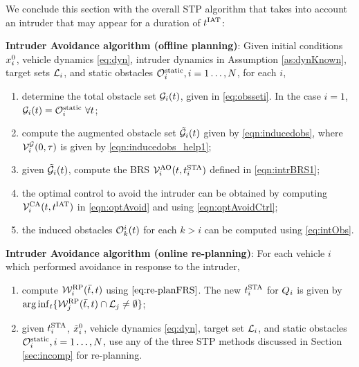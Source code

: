 We conclude this section with the overall STP algorithm that takes into account an intruder that may appear for a duration of $t^\text{IAT}$: 
\begin{alg}
\label{alg:intruder}
\textbf{Intruder Avoidance algorithm (offline planning)}: Given initial conditions $x_i^0$, vehicle dynamics \eqref{eq:dyn}, intruder dynamics in Assumption \ref{as:dynKnown}, target sets $\mathcal{L}_i$, and static obstacles $\mathcal{O}^\text{static}_i, i = 1\ldots, N$, for each $i$,
\begin{enumerate}
\item determine the total obstacle set $\mathcal{G}_i(t)$, given in \eqref{eq:obsseti}. In the case $i=1$, $\mathcal{G}_i(t) = \mathcal{O}^\text{static}_i ~ \forall t$;
\item compute the augmented obstacle set $\tilde{\mathcal{G}}_i(t)$ given by \eqref{eqn:inducedobs}, where $\mathcal{V}^{\mathcal{G}}_{i}(0, \tau)$ is given by \eqref{eqn:inducedobs_help1};
\item given $\tilde{\mathcal{G}}_i(t)$, compute the BRS $\mathcal{V}^{\text{AO}}_{i}(t, t^\text{STA}_i)$ defined in \eqref{eqn:intrBRS1};
\item the optimal control to avoid the intruder can be obtained by computing $\mathcal{V}^{\text{CA}}_{i}(t, t^\text{IAT})$ in \eqref{eqn:optAvoid} and using \eqref{eqn:optAvoidCtrl};
\item the induced obstacles $\mathcal{O}_k^i(t)$ for each $k>i$ can be computed using \eqref{eq:intObs}.
\end{enumerate}

\textbf{Intruder Avoidance algorithm (online re-planning)}: For each vehicle $i$ which performed avoidance in response to the intruder,
\begin{enumerate}
\item compute $\mathcal{W}_i^{\text{RP}}(\bar{t}, t)$ using $\eqref{eq:re-planFRS}$. The new $t^\text{STA}_i$ for $Q_i$ is given by $\arg \inf_t \{ \mathcal{W}_j^{\text{RP}}(\bar{t}, t) \cap \mathcal{L}_j \neq \emptyset \}$;
\item given $t^\text{STA}_i$, $\tilde{x}_i^0$, vehicle dynamics \eqref{eq:dyn}, target set $\mathcal{L}_i$, and static obstacles $\mathcal{O}^\text{static}_i, i = 1\ldots, N$, use any of the three STP methods discussed in Section \ref{sec:incomp} for re-planning. 
\end{enumerate}
\end{alg}